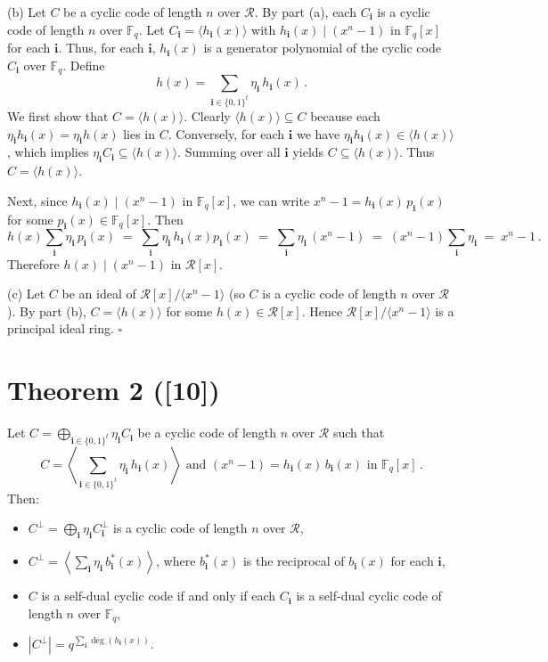 \documentclass[12pt]{article}
\begin{document}
(b) Let $C$ be a cyclic code of length $n$ over $\mathcal{R}$. By part (a), each $C_{\mathbf{i}}$ is a cyclic code of length $n$ over $\mathbb{F}_q$. Let $C_{\mathbf{i}} = \langle h_{\mathbf{i}}(x) \rangle$ with $h_{\mathbf{i}}(x) \mid (x^n - 1)$ in $\mathbb{F}_q[x]$ for each $\mathbf{i}$. Thus, for each $\mathbf{i}$, $h_{\mathbf{i}}(x)$ is a generator polynomial of the cyclic code $C_{\mathbf{i}}$ over $\mathbb{F}_q$. Define 
\[
h(x) = \sum_{\mathbf{i} \in \{0,1\}^t} \eta_{\mathbf{i}}\, h_{\mathbf{i}}(x)\,.
\] 
We first show that $C = \langle h(x) \rangle$. Clearly $\langle h(x) \rangle \subseteq C$ because each $\eta_{\mathbf{i}} h_{\mathbf{i}}(x) = \eta_{\mathbf{i}} h(x)$ lies in $C$. Conversely, for each $\mathbf{i}$ we have $\eta_{\mathbf{i}} h_{\mathbf{i}}(x) \in \langle h(x) \rangle$, which implies $\eta_{\mathbf{i}} C_{\mathbf{i}} \subseteq \langle h(x) \rangle$. Summing over all $\mathbf{i}$ yields $C \subseteq \langle h(x) \rangle$. Thus $C = \langle h(x) \rangle$. 

Next, since $h_{\mathbf{i}}(x) \mid (x^n - 1)$ in $\mathbb{F}_q[x]$, we can write $x^n - 1 = h_{\mathbf{i}}(x)\, p_{\mathbf{i}}(x)$ for some $p_{\mathbf{i}}(x) \in \mathbb{F}_q[x]$. Then 
\[
h(x) \sum_{\mathbf{i}} \eta_{\mathbf{i}}\, p_{\mathbf{i}}(x) \;=\; \sum_{\mathbf{i}} \eta_{\mathbf{i}}\, h_{\mathbf{i}}(x) p_{\mathbf{i}}(x) \;=\; \sum_{\mathbf{i}} \eta_{\mathbf{i}}\, (x^n - 1) \;=\; (x^n - 1) \sum_{\mathbf{i}} \eta_{\mathbf{i}} \;=\; x^n - 1\,.
\] 
Therefore $h(x) \mid (x^n - 1)$ in $\mathcal{R}[x]$.

(c) Let $C$ be an ideal of $\mathcal{R}[x]/\langle x^n - 1 \rangle$ (so $C$ is a cyclic code of length $n$ over $\mathcal{R}$). By part (b), $C = \langle h(x) \rangle$ for some $h(x) \in \mathcal{R}[x]$. Hence $\mathcal{R}[x]/\langle x^n - 1 \rangle$ is a principal ideal ring. \hfill $\square$

\section*{Theorem 2 ([10])}
Let $C = \bigoplus\limits_{\mathbf{i} \in \{0,1\}^t} \eta_{\mathbf{i}} C_{\mathbf{i}}$ be a cyclic code of length $n$ over $\mathcal{R}$ such that 
\[
C = \left\langle \sum_{\mathbf{i} \in \{0,1\}^t} \eta_{\mathbf{i}}\, h_{\mathbf{i}}(x) \right\rangle \text{ and } (x^n - 1) = h_{\mathbf{i}}(x)\, b_{\mathbf{i}}(x) \text{ in } \mathbb{F}_q[x]\,. 
\] 
Then:
\begin{itemize}
    \item[(a)] $C^{\perp} = \bigoplus\limits_{\mathbf{i}} \eta_{\mathbf{i}} C_{\mathbf{i}}^{\perp}$ is a cyclic code of length $n$ over $\mathcal{R}$,
    \item[(b)] $C^{\perp} = \left\langle \sum\limits_{\mathbf{i}} \eta_{\mathbf{i}}\, b_{\mathbf{i}}^*(x) \right\rangle$, where $b_{\mathbf{i}}^*(x)$ is the reciprocal of $b_{\mathbf{i}}(x)$ for each $\mathbf{i}$,
    \item[(c)] $C$ is a self-dual cyclic code if and only if each $C_{\mathbf{i}}$ is a self-dual cyclic code of length $n$ over $\mathbb{F}_q$,
    \item[(d)] $|C^{\perp}| = q^{\sum\limits_{\mathbf{i}} \deg(h_{\mathbf{i}}(x))}$.
\end{itemize}
\end{document}
